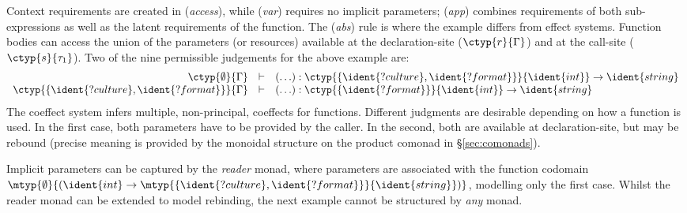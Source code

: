 Context requirements are created in (\emph{access}), while (\emph{var}) requires no
implicit parameters; (\emph{app}) combines requirements of
both sub-expressions as well as the latent requirements of the
function. The (\emph{abs}) rule is where the example differs from
effect systems.  Function bodies can access the union of the
parameters (or resources) available at the declaration-site ($\ctyp{r}{\Gamma}$) and
at the call-site ($\ctyp{s}{\tau_1}$). Two of the nine permissible
judgements for the above example are:
%
\newcommand{\cfebody}{(\ldots)} %
\begin{equation*}
\begin{array}{rcl}
\ctyp{\emptyset}{\Gamma} &\vdash& \cfebody : \ctyp{\{\ident{?culture}, \ident{?format} \}}{\ident{int}} \rightarrow \ident{string}\\
\ctyp{\{\ident{?culture}, \ident{?format}\}}{\Gamma} &\vdash& \cfebody : \ctyp{\{\ident{?format}\}}{\ident{int}} \rightarrow \ident{string}
\end{array}
\end{equation*}
%
The coeffect system infers multiple, \ie{} non-principal, coeffects for functions.
Different judgments are desirable depending on how a function is used. 
In the first case, both parameters have to be provided by the caller.
In the second, both are available at declaration-site, but  may be
rebound (precise meaning is provided by the monoidal structure on the product comonad in \S\ref{sec:comonads}).

Implicit parameters can be captured by the
\emph{reader} monad, where parameters are associated with the function codomain $\mtyp{\emptyset}{(\ident{int} \rightarrow
  \mtyp{\{\ident{?culture}, \ident{?format} \}}{\ident{string}})}$,
modelling only the first case. Whilst the reader monad can be extended to model rebinding, 
the next example cannot be structured by \emph{any} monad.


